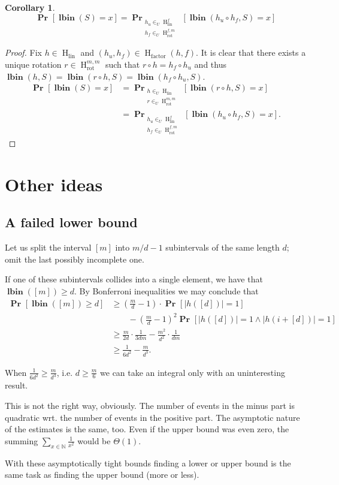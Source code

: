 \documentclass{article}
\newcommand{\hlinr}[1]{\operatorname{H}_{\operatorname{lin}}^{#1}}
\newcommand{\hlin}{\operatorname{H}_{\operatorname{lin}}}
\newcommand{\hfact}[2]{\operatorname{H}_{\operatorname{factor}}({#1}, {#2})}
\newcommand{\rot}[2]{\operatorname{H}_{\operatorname{rot}}^{{#1}, {#2}}}
\newcommand{\lbin}[2]{\operatorname{\mathbf{lbin}}({#1}, {#2})}
\newcommand{\vlbin}[1]{\operatorname{\mathbf{lbin}}({#1})}
\newcommand{\probs}[2]{\operatorname{\mathbf{Pr}}_{{#1}}\left[{#2}\right]}
\newcommand{\prob}[1]{\probs{}{#1}}
\newcommand{\inu}{\in_U}
\newtheorem{corollary}{Corollary}
\begin{document}
\begin{corollary}
\[
    \prob{\vlbin{S} = x} = \probs{\substack{h_u \inu \hlinr{f} \\ h_f \inu \rot{f}{m}}}{\lbin{h_u \circ h_f}{S} = x}
\]
\end{corollary}
\begin{proof}
Fix $h \in \hlin$ and $(h_u, h_f) \in \hfact{h}{f}$.
It is clear that there exists a unique rotation $r \in \rot{m}{m}$ such that $r \circ h = h_f \circ h_u$ and thus $\lbin{h}{S} = \lbin{r \circ h}{S} = \lbin{h_f \circ h_u}{S}$.
\begin{align*}
    \prob{\vlbin{S} = x} & = \probs{\substack{h \inu \hlin \\ r \inu \rot{m}{m}}}{\lbin{r \circ h}{S} = x} \\
        & = \probs{\substack{h_u \inu \hlinr{f} \\ h_f \inu \rot{f}{m}}}{\lbin{h_u \circ h_f}{S} = x}.
\end{align*}
\end{proof}

\section{Other ideas}
\subsection{A failed lower bound}
Let us split the interval $[m]$ into $m/d - 1$ subintervals of the same length $d$; omit the last possibly incomplete one.

If one of these subintervals collides into a single element, we have that $\vlbin{[m]} \geq d$.
By Bonferroni inequalities we may conclude that
\[
\begin{split}
\prob{\vlbin{[m]} \geq d} & \geq \left(\frac{m}{d} - 1\right) \cdot \prob{|h([d])| = 1} \\
	& \qquad - \left(\frac{m}{d} - 1\right)^2\prob{|h([d])| = 1 \wedge |h(i + [d])| = 1} \\
	& \geq \frac{m}{2d} \cdot \frac{1}{3dm} - \frac{m^2}{d^2} \cdot \frac{1}{dm} \\
	& \geq \frac{1}{6d^2} - \frac{m}{d^3}.
\end{split}
\]

When $\frac{1}{6d^2} \geq \frac{m}{d^3}$, i.e. $d \geq \frac{m}{6}$ we can take an integral only with an uninteresting result.

This is not the right way, obviously.
The number of events in the minus part is quadratic wrt. the number of events in the positive part.
The asymptotic nature of the estimates is the same, too.
Even if the upper bound was even zero, the summing $\sum_{x \in \mathbb{N}}\frac{1}{x^2}$ would be $\Theta(1)$.

With these asymptotically tight bounds finding a lower or upper bound is the same task as finding the upper bound (more or less).
\end{document}
